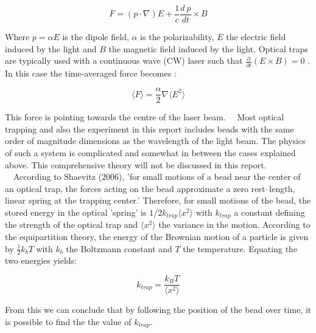 \begin{equation}
	F  =  (p \cdot \nabla)E + \frac{1}{c} \frac{d \: p}{dt} \times B
\end{equation}

Where $ p = \alpha E $ is the dipole field, $\alpha $ is the polarizability, $E$ the electric field induced by the light and $B$ the magnetic field induced by the light. Optical traps are typically used with a continuous wave (CW) laser such that $ \frac{\partial}{\partial t}(E \times B) = 0 $ . In this case the time-averaged force becomes \cite{shaevitz}:

\begin{equation}
	\big \langle F \big \rangle  = \frac{ \alpha }{2} \nabla \big \langle E^2 \big \rangle
\end{equation}

This force is pointing towards the centre of the laser beam. \
\ 
Most optical trapping and also the experiment in this report includes beads with the same order of magnitude dimensions as the wavelength of the light beam. The physics of such a system is complicated and somewhat in between the cases explained above. This comprehensive theory will not be discussed in this report. \
\
According to Shaevitz (2006), 'for small motions of a bead near the center of an optical trap, the forces acting on the bead approximate a zero rest–length, linear spring at the trapping center.' Therefore, for small motions of the bead, the stored energy in the optical 'spring' is $1/2 k_{trap} \langle x^2 \rangle $ with $k_{trap}$ a constant defining the strength of the optical trap and $ \langle x^2 \rangle $ the variance in the motion. According to the equipartition theory, the energy of the Brownian motion of a particle is given by $\frac{1}{2} k_b T $ with $ k_b $ the Boltzmann constant and $T$ the temperature.\cite{shaevitz} Equating the two energies yields:

\begin{equation} 
	\label{eq_k_trap}
	k_{trap} = \frac{k_B T}{ \langle x^2 \rangle}
\end{equation}

From this we can conclude that by following the position of the bead over time, it is possible to find the the value of $k_{trap}$. \


